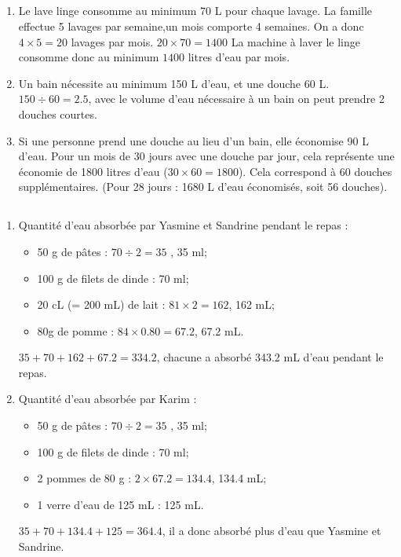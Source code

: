 \documentclass[12pt,a4paper]{article}
\begin{document}
\newpage

\subsection*{}

\begin{enumerate}
	\item  Le lave linge consomme au minimum 70 L pour chaque lavage. La famille effectue 5 lavages par semaine,un mois comporte 4 semaines. On a donc $4 \times 5 = 20$ lavages par mois. $20 \times 70 =\num{ 1400}$ La machine à laver le linge consomme donc au minimum $\num{1400}$ litres d'eau par mois.
	
	\item Un bain nécessite au minimum 150 L d'eau, et une douche 60 L. $150 \div 60 = \num{2.5}$, avec le volume d'eau nécessaire à un bain on peut prendre 2 douches courtes.
	
	\item Si une personne prend une douche au lieu d'un bain, elle économise 90 L d'eau. Pour un mois de 30 jours avec une douche par jour, cela représente une économie de \num{1800} litres d'eau ($30 \times 60 = \num{1800}$). Cela correspond à 60 douches supplémentaires. (Pour 28 jours : 1680 L d'eau économisés, soit 56 douches).
\end{enumerate}

\subsection*{}
\begin{enumerate}[label=\alph*)]
	\item Quantité d'eau absorbée par Yasmine et Sandrine pendant le repas :
		\begin{itemize}
			\item 50 g de pâtes : $70 \div 2 = 35$ , 35 ml;
			\item 100 g de filets de dinde : 70 ml;
			\item 20 cL (= 200 mL) de lait : $81 \times 2 = 162$, 162 mL;
			\item 80g de pomme : $84 \times \num{0.80} = \num{67.2}$, \num{67,2} mL.
		\end{itemize}
		$35 + 70 + 162 + \num{67.2} = \num{334,2}$, chacune a absorbé \num{343.2} mL d'eau pendant le repas.
	
	
	\item Quantité d'eau absorbée par Karim :
		
		\begin{itemize}
			\item 50 g de pâtes : $70 \div 2 = 35$ , 35 ml;
			\item 100 g de filets de dinde : 70 ml;
			\item 2 pommes de 80 g : $2 \times \num{67.2} = \num{134.4}$, \num{134.4} mL;
			\item 1 verre d'eau de 125 mL : 125 mL.
		\end{itemize}
		$35 + 70 + \num{134.4} + 125 = \num{364,4}$, il a donc absorbé plus d'eau que Yasmine et Sandrine.
\end{enumerate}
\end{document}
